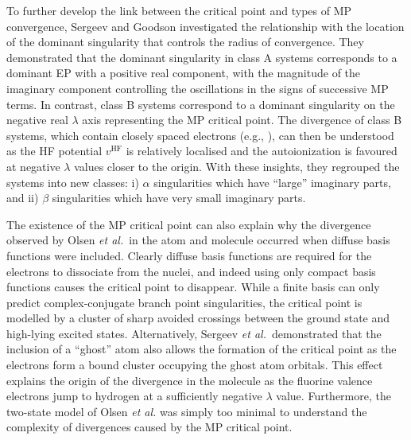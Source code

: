 \documentclass[aps,prb,reprint,noshowkeys,linenumbers,superscriptaddress]{revtex4-1}
\newcommand{\latin}[1]{#1}
\newcommand{\eg}{\latin{e.g.}}
\newcommand{\etal}{\textit{et al.}}
\begin{document}
To further develop the link between the critical point and types of MP convergence, Sergeev and Goodson investigated
the relationship with the location of the dominant singularity that controls the radius of convergence.\cite{Goodson_2004}
They demonstrated that the dominant singularity in class A systems corresponds to a dominant EP with a positive real component, 
with the magnitude of the imaginary component controlling the oscillations in the signs of successive MP 
terms.\cite{Goodson_2000a,Goodson_2000b}
In contrast, class B systems correspond to a dominant singularity on the negative real $\lambda$ axis representing
the MP critical point.
The divergence of class B systems, which contain closely spaced electrons (\eg, ), can then be understood as the 
HF potential $v^{\text{HF}}$ is relatively localised and the autoionization is favoured at negative 
$\lambda$ values closer to the origin.
With these insights, they regrouped the systems into new classes: i) $\alpha$ singularities which have ``large'' imaginary parts, 
and ii) $\beta$ singularities which have very small imaginary parts.\cite{Goodson_2004,Sergeev_2006} 

The existence of the MP critical point can also explain why the divergence observed by Olsen \etal\ in the  atom 
and  molecule occurred when diffuse basis functions were included.\cite{Olsen_1996}
Clearly diffuse basis functions are required for the electrons to dissociate from the nuclei, and indeed using
only compact basis functions causes the critical point to disappear.
While a finite basis can only predict complex-conjugate branch point singularities, the critical point is modelled
by a cluster of sharp avoided crossings between the ground state and high-lying excited states.\cite{Sergeev_2005}
Alternatively, Sergeev \etal\ demonstrated that the inclusion of a ``ghost'' atom also
allows the formation of the critical point as the electrons form a bound cluster occupying the ghost atom orbitals.\cite{Sergeev_2005}
This effect explains the origin of the divergence in the  molecule as the fluorine valence electrons jump to hydrogen at
 a sufficiently negative $\lambda$ value.\cite{Sergeev_2005}
Furthermore, the two-state model of Olsen \etal{}\cite{Olsen_2000} was simply too minimal to understand the complexity of 
divergences caused by the MP critical point.
\end{document}

